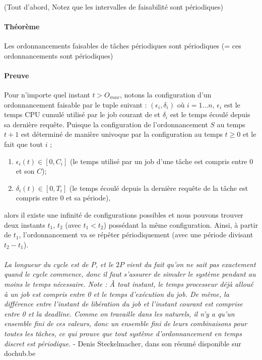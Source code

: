 \paragraph{} (Tout d'abord, Notez que les intervalles de faisabilité sont périodiques)

\paragraph{Théorème} Les ordonnancements faisables de tâches périodiques sont périodiques (= ces ordonnancements sont périodiques)

\paragraph{Preuve} Pour n'importe quel instant $t > O_{max}$, notons la configuration d'un ordonnancement faisable par le tuple suivant : $(\epsilon_{i}, \delta_{i})$ où $i = 1...n$, $\epsilon_{i}$ est le temps CPU cumulé utilisé par le job courant de \ti et $\delta_{i}$ est le temps écoulé depuis sa dernière requête. Puisque la configuration de l'ordonnancement $S$ au temps $t+1$ est déterminé de manière univoque par la configuration au temps $t \geq 0$ et le fait que tout $i$ ;
\begin{enumerate}
\item $\epsilon_{i}(t) \in [0, C_{i}]$ (le temps utilisé par un job d'une tâche est compris entre 0 et son $C$);
\item $\delta_{i}(t) \in [0, T_{i}]$ (le temps écoulé depuis la dernière requête de la tâche est compris entre 0 et sa période),
\end{enumerate}alors il existe une infinité de configurations possibles et nous pouvons trouver deux instants $t_{1}$, $t_{2}$ (avec $t_{1} < t_{2}$) possédant la même configuration. Ainsi, à partir de $t_{1}$, l'ordonnancement va se répêter périodiquement (avec une période divisant $t_{2} - t_{1}$).

\paragraph{}
\textit{La longueur du cycle est de $P$, et le $2P$ vient du fait qu’on ne sait pas exactement quand le cycle commence, donc il faut s’assurer de simuler le système pendant au moins le temps nécessaire.
Note : À tout instant, le temps processeur déjà alloué à un job est compris entre 0 et le temps d’exécution du job. 
De même, la différence entre l’instant de libération du job et l’instant courant est comprise entre 0 et la deadline. Comme on travaille dans les naturels, il n’y a qu’un ensemble fini de ces valeurs, donc un ensemble fini de leurs combinaisons pour toutes les tâches, ce qui prouve que tout
système d’ordonnancement en temps discret est périodique.} - Denis Steckelmacher, dans son résumé disponible sur dochub.be

